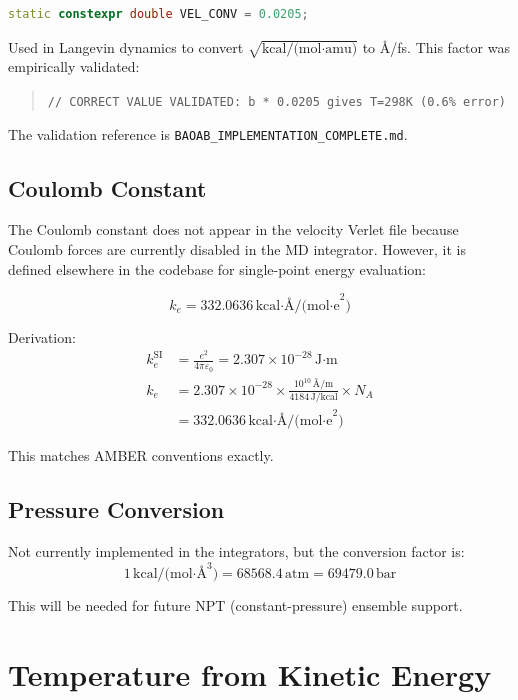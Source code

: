 \documentclass[11pt]{article}
\begin{document}
\begin{lstlisting}[language=C++]
static constexpr double VEL_CONV = 0.0205;
\end{lstlisting}

Used in Langevin dynamics to convert $\sqrt{\text{kcal/(mol·amu)}}$ to \AA/fs. This factor was empirically validated:
\begin{quote}
\texttt{// CORRECT VALUE VALIDATED: b * 0.0205 gives T=298K (0.6\% error)}
\end{quote}

The validation reference is \texttt{BAOAB\_IMPLEMENTATION\_COMPLETE.md}.

\subsection{Coulomb Constant}

The Coulomb constant does not appear in the velocity Verlet file because Coulomb forces are currently disabled in the MD integrator. However, it is defined elsewhere in the codebase for single-point energy evaluation:

\begin{equation}
k_e = 332.0636\,\text{kcal·\AA/(mol·e}^2\text{)}
\end{equation}

Derivation:
\begin{align}
k_e^{\text{SI}} &= \frac{e^2}{4\pi\varepsilon_0} = 2.307 \times 10^{-28}\,\text{J·m} \\
k_e &= 2.307 \times 10^{-28} \times \frac{10^{10}\,\text{\AA/m}}{4184\,\text{J/kcal}} \times N_A \\
&= 332.0636\,\text{kcal·\AA/(mol·e}^2\text{)}
\end{align}

This matches AMBER conventions exactly.

\subsection{Pressure Conversion}

Not currently implemented in the integrators, but the conversion factor is:
\begin{equation}
1\,\text{kcal/(mol·\AA}^3\text{)} = 68568.4\,\text{atm} = 69479.0\,\text{bar}
\end{equation}

This will be needed for future NPT (constant-pressure) ensemble support.

\section{Temperature from Kinetic Energy}
\end{document}
